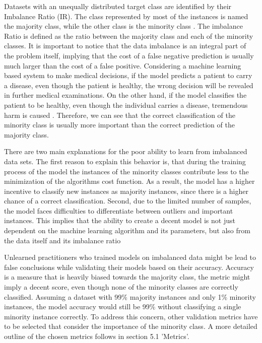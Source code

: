 \documentclass[parskip=full]{scrartcl}
\begin{document}
Datasets with an unequally distributed target class are identified by their Imbalance Ratio (IR). The class represented by most of the instances is named the majority class, while the other class is the minority class \cite{Chawla2003}. The imbalance Ratio is defined as the ratio between the majority class and each of the minority classes. It is important to notice that the data imbalance is an integral part of the problem itself, implying that the cost of a false negative prediction is usually much larger than the cost of a false positive. Considering a machine learning based system to make medical decisions, if the model predicts a patient to carry a disease, even though the patient is healthy, the wrong decision will be revealed in further medical examinations. On the other hand, if the model classifies the patient to be healthy, even though the individual carries a disease, tremendous harm is caused \cite{Wan2014LearningTI}. Therefore, we can see that the correct classification of the minority class is usually more important than the correct prediction of the majority class.

There are two main explanations for the poor ability to learn from imbalanced data sets. The first reason to explain this behavior is, that during the training process of the model the instances of the minority classes contribute less to the minimization of the algorithms cost function. As a result, the model has a higher incentive to classify new instances as majority instances, since there is a higher chance of a correct classification. Second, due to the limited number of samples, the model faces difficulties to differentiate between outliers and important instances. This implies that the ability to create a decent model is not just dependent on the machine learning algorithm and its parameters, but also from the data itself and its imbalance ratio

Unlearned practitioners who trained models on imbalanced data might be lead to false conclusions while validating their models based on their accuracy. Accuracy is a measure that is heavily biased towards the majority class, the metric might imply a decent score, even though none of the minority classes are correctly classified. Assuming a dataset with 99\% majority instances and only 1\% minority instances, the model accuracy would still be 99\% without classifying a single minority instance correctly. To address this concern, other validation metrics have to be selected that consider the importance of the minority class. A more detailed outline of the chosen metrics follows in section 5.1 'Metrics'.
\end{document}

